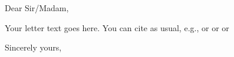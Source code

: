 \documentclass[11pt, autobio,autobib]{iitletterProf}
\date{\today}  %
\begin{document}
\begin{letter}{}

\opening{Dear Sir/Madam,}

\begin{center} \textbf{ } \end{center}

Your letter text goes here. You can cite as usual,
e.g., \textcite{Hic97a} or \parencite{Hic97a} or \textcite{Nie92} or \parencite{Nie92}

\closing{Sincerely yours,}


\end{letter}
\end{document}
